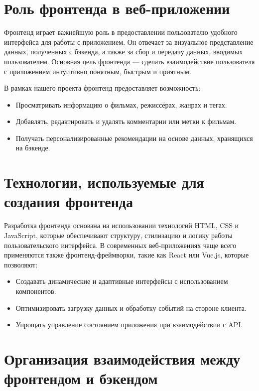 \section{Роль фронтенда в веб-приложении}
Фронтенд играет важнейшую роль в предоставлении пользователю удобного интерфейса для работы с приложением. Он отвечает за визуальное представление данных, полученных с бэкенда, а также за сбор и передачу данных, вводимых пользователем. Основная цель фронтенда — сделать взаимодействие пользователя с приложением интуитивно понятным, быстрым и приятным.

В рамках нашего проекта фронтенд предоставляет возможность:
\begin{itemize}
    \item Просматривать информацию о фильмах, режиссёрах, жанрах и тегах.
    \item Добавлять, редактировать и удалять комментарии или метки к фильмам.
    \item Получать персонализированные рекомендации на основе данных, хранящихся на бэкенде.
\end{itemize}

\section{Технологии, используемые для создания фронтенда}
Разработка фронтенда основана на использовании технологий HTML, CSS и JavaScript, которые обеспечивают структуру, стилизацию и логику работы пользовательского интерфейса. В современных веб-приложениях чаще всего применяются также фронтенд-фреймворки, такие как React или Vue.js, которые позволяют:
\begin{itemize}
    \item Создавать динамические и адаптивные интерфейсы с использованием компонентов.
    \item Оптимизировать загрузку данных и обработку событий на стороне клиента.
    \item Упрощать управление состоянием приложения при взаимодействии с API.
\end{itemize}

\section{Организация взаимодействия между фронтендом и бэкендом}
